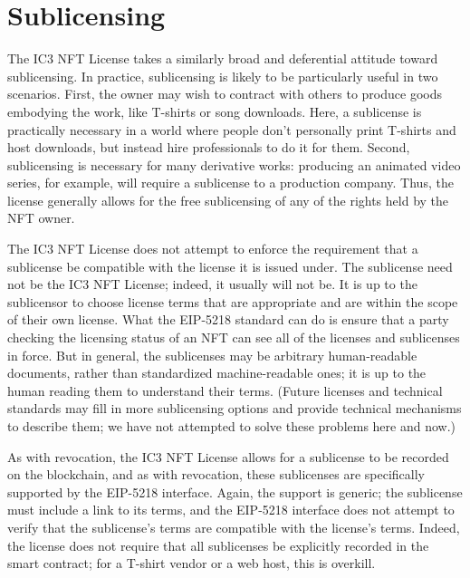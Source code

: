 \documentclass{article}
\newcommand{\eiplicense}{EIP-5218\xspace}
\newcommand{\iccclicense}{IC3 NFT License\xspace}
\begin{document}
\section{Sublicensing}

The \iccclicense takes a similarly broad and deferential attitude toward sublicensing. In practice, sublicensing is likely to be particularly useful in two scenarios. First, the owner may wish to contract with others to produce goods embodying the work, like T-shirts or song downloads. Here, a sublicense is practically necessary in a world where people don't personally print T-shirts and host downloads, but instead hire professionals to do it for them. Second, sublicensing is necessary for many derivative works: producing an animated video series, for example, will require a sublicense to a production company. Thus, the license generally allows for the free sublicensing of any of the rights held by the NFT owner.

The \iccclicense does not attempt to enforce the requirement that a sublicense be compatible with the license it is issued under. The sublicense need not be the \iccclicense; indeed, it usually will not be. It is up to the sublicensor to choose license terms that are appropriate and are within the scope of their own license. What the \eiplicense standard can do is ensure that a party checking the licensing status of an NFT can see all of the licenses and sublicenses in force. But in general, the sublicenses may be arbitrary human-readable documents, rather than standardized machine-readable ones; it is up to the human reading them to understand their terms. (Future licenses and technical standards may fill in more sublicensing options and provide technical mechanisms to describe them; we have not attempted to solve these problems here and now.)

As with revocation, the \iccclicense allows for a sublicense to be recorded on the blockchain, and as with revocation, these sublicenses are specifically supported by the \eiplicense interface. Again, the support is generic; the sublicense must include a link to its terms, and the \eiplicense interface does not attempt to verify that the sublicense's terms are compatible with the license's terms. Indeed, the license does not require that all sublicenses be explicitly recorded in the smart contract; for a T-shirt vendor or a web host, this is overkill. 
\end{document}
